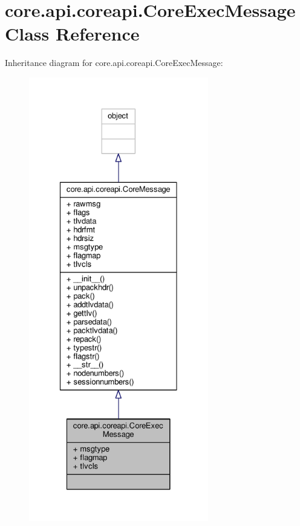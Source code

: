 \hypertarget{classcore_1_1api_1_1coreapi_1_1_core_exec_message}{\section{core.\+api.\+coreapi.\+Core\+Exec\+Message Class Reference}
\label{classcore_1_1api_1_1coreapi_1_1_core_exec_message}
}


Inheritance diagram for core.\+api.\+coreapi.\+Core\+Exec\+Message\+:
\nopagebreak
\begin{figure}[H]
\begin{center}
\leavevmode
\includegraphics[height=550pt]{classcore_1_1api_1_1coreapi_1_1_core_exec_message__inherit__graph}
\end{center}
\end{figure}


